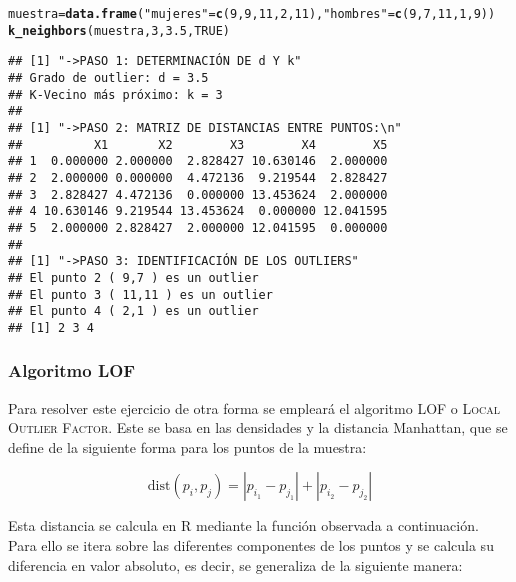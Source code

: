 \documentclass[12pt]{report}\usepackage[]{graphicx}\usepackage[dvipsnames]{xcolor}
\makeatletter
\newcommand{\hlnum}[1]{\textcolor[rgb]{0.686,0.059,0.569}{#1}}%
\newcommand{\hlstr}[1]{\textcolor[rgb]{0.192,0.494,0.8}{#1}}%
\newcommand{\hlstd}[1]{\textcolor[rgb]{0.345,0.345,0.345}{#1}}%
\newcommand{\hlkwb}[1]{\textcolor[rgb]{0.69,0.353,0.396}{#1}}%
\newcommand{\hlkwd}[1]{\textcolor[rgb]{0.737,0.353,0.396}{\textbf{#1}}}%
\newenvironment{kframe}{%
 \def\at@end@of@kframe{}%
 \ifinner\ifhmode%
  \def\at@end@of@kframe{\end{minipage}}%
  \begin{minipage}{\columnwidth}%
 \fi\fi%
 \def\FrameCommand##1{\hskip\@totalleftmargin \hskip-\fboxsep
 \colorbox{shadecolor}{##1}\hskip-\fboxsep
     \hskip-\linewidth \hskip-\@totalleftmargin \hskip\columnwidth}%
 \MakeFramed {\advance\hsize-\width
   \@totalleftmargin\z@ \linewidth\hsize
   \@setminipage}}%
 {\par\unskip\endMakeFramed%
 \at@end@of@kframe}
\newenvironment{knitrout}{}{} %
\newcommand{\dt}{\text{dist}}
\makeatother
\begin{document}
\begin{knitrout}
\color{fgcolor}\begin{kframe}
\begin{alltt}
\hlstd{muestra} \hlkwb{=} \hlkwd{data.frame}\hlstd{(}\hlstr{"mujeres"} \hlstd{=} \hlkwd{c}\hlstd{(}\hlnum{9}\hlstd{,}\hlnum{9}\hlstd{,}\hlnum{11}\hlstd{,}\hlnum{2}\hlstd{,}\hlnum{11}\hlstd{),} \hlstr{"hombres"} \hlstd{=} \hlkwd{c}\hlstd{(}\hlnum{9}\hlstd{,}\hlnum{7}\hlstd{,}\hlnum{11}\hlstd{,}\hlnum{1}\hlstd{,}\hlnum{9}\hlstd{))}
\hlkwd{k_neighbors}\hlstd{(muestra,}\hlnum{3}\hlstd{,}\hlnum{3.5}\hlstd{,}\hlnum{TRUE}\hlstd{)}
\end{alltt}
\begin{verbatim}
## [1] "->PASO 1: DETERMINACIÓN DE d Y k"
## Grado de outlier: d = 3.5 
## K-Vecino más próximo: k = 3 
## 
## [1] "->PASO 2: MATRIZ DE DISTANCIAS ENTRE PUNTOS:\n"
##          X1       X2        X3        X4        X5
## 1  0.000000 2.000000  2.828427 10.630146  2.000000
## 2  2.000000 0.000000  4.472136  9.219544  2.828427
## 3  2.828427 4.472136  0.000000 13.453624  2.000000
## 4 10.630146 9.219544 13.453624  0.000000 12.041595
## 5  2.000000 2.828427  2.000000 12.041595  0.000000
## 
## [1] "->PASO 3: IDENTIFICACIÓN DE LOS OUTLIERS"
## El punto 2 ( 9,7 ) es un outlier
## El punto 3 ( 11,11 ) es un outlier
## El punto 4 ( 2,1 ) es un outlier
## [1] 2 3 4
\end{verbatim}
\end{kframe}
\end{knitrout}
					
					
					\subsubsection{Algoritmo LOF}
					
						Para resolver este ejercicio de otra forma se empleará el algoritmo LOF o \textsc{Local Outlier Factor}. Este se basa en las densidades y la distancia Manhattan, que se define de la siguiente forma para los puntos de la muestra: 
						
						$$
						\dt(p_i, p_j) = |p_{i_1}-p_{j_1}| + |p_{i_2}-p_{j_2}|
						$$
						
						Esta distancia se calcula en R mediante la función observada a continuación. Para ello se itera sobre las diferentes componentes de los puntos y se calcula su diferencia en valor absoluto, es decir, se generaliza de la siguiente manera: 
						
\end{document}
